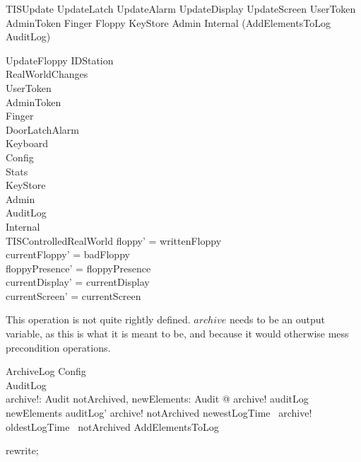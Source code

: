 \begin{zed}
TISUpdate  UpdateLatch \land  UpdateAlarm \land  UpdateDisplay \land  UpdateScreen \land  \Xi UserToken \land  \Xi AdminToken \land  \Xi Finger \land  \Xi Floppy \land  \Xi KeyStore \land  \Xi Admin \land  \Xi Internal \land  (AddElementsToLog \lor  \Xi AuditLog)
\end{zed}

\begin{schema}{UpdateFloppy}
  \Delta IDStation\\
  RealWorldChanges\\
  \Xi UserToken\\
  \Xi AdminToken\\
  \Xi Finger\\
  \Xi DoorLatchAlarm\\
  \Xi Keyboard\\
  \Xi Config\\
  \Xi Stats\\
  \Xi KeyStore\\
  \Xi Admin\\
  \Xi AuditLog\\
  \Xi Internal\\
  \Xi TISControlledRealWorld
\where
  floppy' = writtenFloppy\\
  currentFloppy' = badFloppy\\
  floppyPresence' = floppyPresence\\
  currentDisplay' = currentDisplay\\
  currentScreen' = currentScreen
\end{schema}

This operation is not quite rightly defined. $archive$ needs to be an
output variable, as this is what it is meant to be, and because it would
otherwise mess precondition operations.
%
\begin{schema}{ArchiveLog}
  Config\\
  \Delta AuditLog\\
  archive!: \finset  Audit
\where
  \exists  notArchived, newElements: \finset  Audit @ 
      archive! \subseteq  auditLog \cup  newElements \land
      auditLog' \subseteq  archive! \cup  notArchived \land
      newestLogTime~ archive! \leq  oldestLogTime~ notArchived \land
      AddElementsToLog
\end{schema}

\begin{zproof}
rewrite;
\end{zproof}

